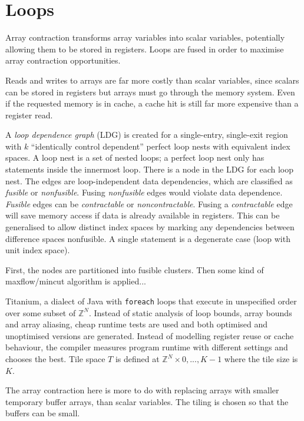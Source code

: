 \section{Loops}

Array contraction transforms array variables into scalar variables,
potentially allowing them to be stored in registers.
Loops are fused in order to maximise array contraction opportunities.

Reads and writes to arrays are far more costly than scalar variables, since
scalars can be stored in registers but arrays must go through the memory system.
Even if the requested memory is in cache, a cache hit is still far more expensive than a register read.

A \emph{loop dependence graph} (LDG) is created for a single-entry, single-exit region with $k$ ``identically control dependent'' perfect loop nests with equivalent index spaces.
A loop nest is a set of nested loops; a perfect loop nest only has statements inside the innermost loop.
There is a node in the LDG for each loop nest.
The edges are loop-independent data dependencies, which are classified as \emph{fusible} or \emph{nonfusible}.
Fusing \emph{nonfusible} edges would violate data dependence. \emph{Fusible} edges can be \emph{contractable} or \emph{noncontractable}.
Fusing a \emph{contractable} edge will save memory access if data is already available in registers.
This can be generalised to allow distinct index spaces by marking any dependencies between difference spaces nonfusible. A single statement is a degenerate case (loop with unit index space).

First, the nodes are partitioned into fusible clusters. Then some kind of maxflow/mincut algorithm is applied...


Titanium, a dialect of Java with {\tt foreach} loops that execute in unspecified order over some subset of $\mathbb{Z}^N$.
Instead of static analysis of loop bounds, array bounds and array aliasing, cheap runtime tests are used
and both optimised and unoptimised versions are generated.
Instead of modelling register reuse or cache behaviour, the compiler measures program runtime with different settings and chooses the best.
Tile space $T$ is defined at $\mathbb{Z}^N \times {0, ... , K - 1}$ where the tile size is $K$.

The array contraction here is more to do with replacing arrays with smaller temporary buffer arrays, than scalar variables.
The tiling is chosen so that the buffers can be small.

